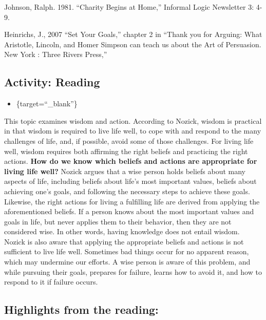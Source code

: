 \documentclass[
]{book}
\providecommand{\tightlist}{%
  \setlength{\itemsep}{0pt}\setlength{\parskip}{0pt}}
\begin{document}
Johnson, Ralph. 1981. ``Charity Begins at Home,'' Informal Logic Newsletter 3: 4-9.

Heinrichs, J., 2007 ``Set Your Goals,'' chapter 2 in ``Thank you for Arguing: What Aristotle, Lincoln, and Homer Simpson can teach us about the Art of Persuasion. New York : Three Rivers Press,''

\hypertarget{activity-reading}{%
\subsection*{Activity: Reading}\label{activity-reading}}

\begin{reflect}
\begin{itemize}
\tightlist
\item
  \href{assets/u1/PAT_10018662_What_is_Wisdom.pdf}{}
  \{target=``\_blank''\}
\end{itemize}
\end{reflect}

This topic examines wisdom and action. According to Nozick, wisdom is practical in that wisdom is required to live life well, to cope with and respond to the many challenges of life, and, if possible, avoid some of those challenges. For living life well, wisdom requires both affirming the right beliefs and practicing the right actions. \textbf{How do we know which beliefs and actions are appropriate for living life well?} Nozick argues that a wise person holds beliefs about many aspects of life, including beliefs about life's most important values, beliefs about achieving one's goals, and following the necessary steps to achieve these goals. Likewise, the right actions for living a fulfilling life are derived from applying the aforementioned beliefs. If a person knows about the most important values and goals in life, but never applies them to their behavior, then they are not considered wise. In other words, having knowledge does not entail wisdom. Nozick is also aware that applying the appropriate beliefs and actions is not sufficient to live life well. Sometimes bad things occur for no apparent reason, which may undermine our efforts. A wise person is aware of this problem, and while pursuing their goals, prepares for failure, learns how to avoid it, and how to respond to it if failure occurs.

\hypertarget{highlights-from-the-reading}{%
\subsection{Highlights from the reading:}\label{highlights-from-the-reading}}
\end{document}
